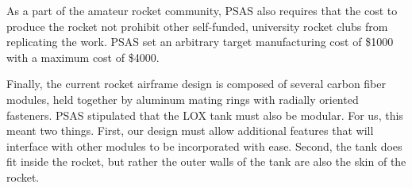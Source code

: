 As a part of the amateur rocket community, PSAS also requires that the cost to produce the rocket not prohibit other self-funded, university rocket clubs from replicating the work. PSAS set an arbitrary target manufacturing cost of \$1000 with a maximum cost of \$4000. 



Finally, the current rocket airframe design is composed of several carbon fiber modules, held together by aluminum mating rings with radially oriented fasteners. PSAS stipulated that the LOX tank must also be modular. For us, this meant two things. First, our design must allow additional features that will interface with other modules to be incorporated with ease. Second, the tank does fit inside the rocket, but rather the outer walls of the tank are also the skin of the rocket.  







\newpage